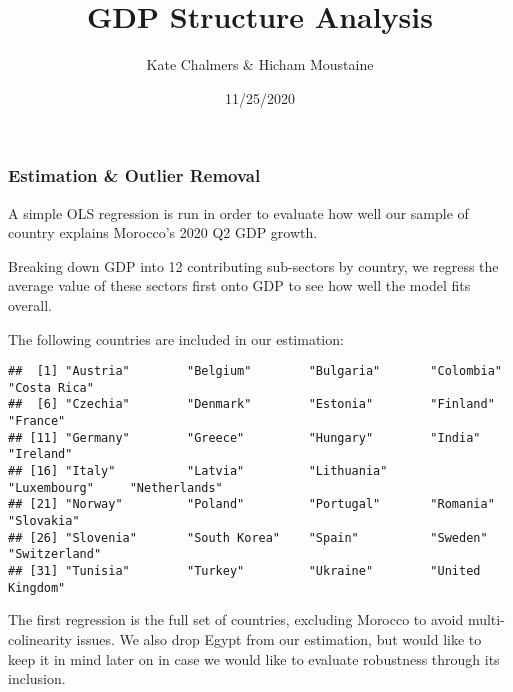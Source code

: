 \documentclass[
]{article}
\title{GDP Structure Analysis}
\author{Kate Chalmers \& Hicham Moustaine}
\date{11/25/2020}
\newenvironment{Shaded}{\begin{snugshade}}{\end{snugshade}}
\newcommand{\KeywordTok}[1]{\textcolor[rgb]{0.13,0.29,0.53}{\textbf{#1}}}
\newcommand{\NormalTok}[1]{#1}
\newcommand{\OperatorTok}[1]{\textcolor[rgb]{0.81,0.36,0.00}{\textbf{#1}}}
\begin{document}
\maketitle

\hypertarget{estimation-outlier-removal}{%
\subsubsection{Estimation \& Outlier
Removal}\label{estimation-outlier-removal}}

A simple OLS regression is run in order to evaluate how well our sample
of country explains Morocco's 2020 Q2 GDP growth.

Breaking down GDP into 12 contributing sub-sectors by country, we
regress the average value of these sectors first onto GDP to see how
well the model fits overall.

The following countries are included in our estimation:

\begin{Shaded}
\end{Shaded}

\begin{verbatim}
##  [1] "Austria"        "Belgium"        "Bulgaria"       "Colombia"       "Costa Rica"    
##  [6] "Czechia"        "Denmark"        "Estonia"        "Finland"        "France"        
## [11] "Germany"        "Greece"         "Hungary"        "India"          "Ireland"       
## [16] "Italy"          "Latvia"         "Lithuania"      "Luxembourg"     "Netherlands"   
## [21] "Norway"         "Poland"         "Portugal"       "Romania"        "Slovakia"      
## [26] "Slovenia"       "South Korea"    "Spain"          "Sweden"         "Switzerland"   
## [31] "Tunisia"        "Turkey"         "Ukraine"        "United Kingdom"
\end{verbatim}

The first regression is the full set of countries, excluding Morocco to
avoid multi-colinearity issues. We also drop Egypt from our estimation,
but would like to keep it in mind later on in case we would like to
evaluate robustness through its inclusion.
\end{document}
